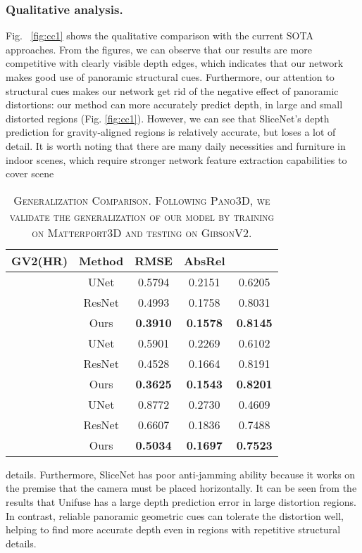 \documentclass[10pt,times,mathptm,psfig,twocolumn,journals]{IEEEtran}
\begin{document}
 \subsubsection{Qualitative analysis.} Fig. ~\ref{fig:cc1} shows the qualitative comparison with the current SOTA approaches. From the figures, we can observe that our results are more competitive with clearly visible depth edges, which indicates that our network makes good use of panoramic structural cues. Furthermore, our attention to structural cues makes our network get rid of the negative effect of panoramic distortions: our method can more accurately predict depth, in large and small distorted regions (Fig. \ref{fig:cc1}). However, we can see that SliceNet's depth prediction for gravity-aligned regions is relatively accurate, but loses a lot of detail. It is worth noting that there are many daily necessities and furniture in indoor scenes, which require stronger network feature extraction capabilities to cover scene\begin{table}[t]
\begin{center}
\caption{\textsc{Generalization Comparison. Following Pano3D, we validate the generalization of our model by training on Matterport3D and testing on GibsonV2.}}
\label{table:gene}
\setlength\tabcolsep{3pt}
\begin{tabular}{c c c c c}
\hline GV2(HR) & Method & RMSE  & AbsRel  & \\
\hline
 & UNet\cite{albanis2021pano3d}  & 0.5794 & 0.2151& 0.6205\\
 & ResNet\cite{albanis2021pano3d}  & 0.4993 & 0.1758 & 0.8031\\
& Ours  & \textbf{0.3910} & \textbf{0.1578} & \textbf{0.8145} \\
\hline
\noalign{\smallskip}
\hline
 & UNet\cite{albanis2021pano3d}  & 0.5901 & 0.2269 & 0.6102\\
& ResNet\cite{albanis2021pano3d}  & 0.4528 & 0.1664 & 0.8191\\
& Ours  & \textbf{0.3625} & \textbf{0.1543} & \textbf{0.8201} \\
\hline
\noalign{\smallskip}
\hline
& UNet\cite{albanis2021pano3d}  & 0.8772 & 0.2730 & 0.4609\\
 & ResNet\cite{albanis2021pano3d}  & 0.6607 & 0.1836 &0.7488\\
& Ours  & \textbf{0.5034} & \textbf{0.1697} & \textbf{0.7523} \\
\hline
\end{tabular}\end{center}
\end{table}
details. Furthermore, SliceNet has poor anti-jamming ability because it works on the premise that the camera must be placed horizontally. It can be seen from the results that Unifuse has a large depth prediction error in large distortion regions. In contrast, reliable panoramic geometric cues can tolerate the distortion well, helping to find more accurate depth even in regions with repetitive structural details.
\end{document}
